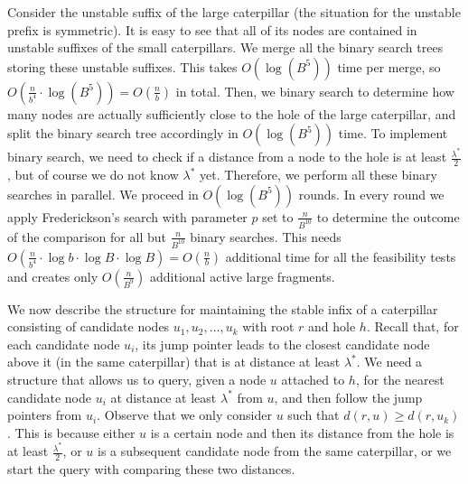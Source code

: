 \documentclass[a4paper,UKenglish]{lipics-v2016}
\theoremstyle{plain}
\begin{document}
\vspace{0.04in} 
Consider the unstable suffix of the large caterpillar (the situation for the unstable prefix is
symmetric). It is easy to see that all of its nodes are contained in unstable suffixes of
the small caterpillars. We merge all the binary search trees storing these unstable suffixes.
This takes $O(\log (B^5))$ time per merge, so $O(\frac{n}{b^{4}}\cdot \log (B^5))=O(\frac{n}{b})$ in total.
Then, we binary search to determine how many nodes are actually sufficiently close to the hole of the large caterpillar, and
 split the binary search tree accordingly in $O(\log (B^{5}))$ time. To implement binary search, we need to
check if a distance from a node to the hole is at least $\frac{\lambda^{*}}{2}$, but of course we
do not know $\lambda^{*}$ yet. Therefore, we perform all these binary searches in parallel. We proceed in $O(\log (B^{5}))$ rounds. In every round we apply Frederickson's search
with parameter $p$ set to $\frac{n}{B^{10}}$ to determine  the outcome of the comparison for all
but $\frac{n}{B^{10}}$ binary searches. This needs
$O(\frac{n}{b^{4}}\cdot\log b\cdot\log B\cdot\log B)=O(\frac{n}{b})$ additional time for
all the feasibility tests and creates only  $O(\frac{n}{B^{9}})$  additional active large fragments.

\vspace{0.04in} 
We now describe the structure for maintaining the stable infix of a caterpillar consisting of candidate nodes $u_{1},u_{2},\ldots,u_{k}$ with root $r$ and hole $h$. 
Recall that, for each candidate node $u_i$, its jump pointer leads to the closest candidate node above it (in the same caterpillar) that is at distance at least $\lambda ^*$. 
We need a structure that allows us to query, given a node $u$ attached to $h$, for the nearest candidate node $u_{i}$ at distance at least $\lambda^{*}$ from $u$, and then follow the jump pointers from $u_{i}$.
%
Observe that we only consider $u$ such that $d(r,u)\geq d(r,u_{k})$. This is because either $u$ is a certain node and then its distance from the hole is at least
$\frac{\lambda^{*}}{2}$, or $u$ is a subsequent candidate node from the same caterpillar,
or we start the query with comparing these two distances.
\end{document}
